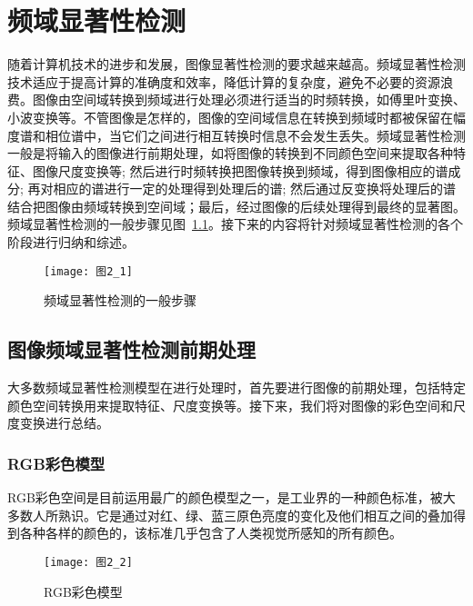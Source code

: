 

\chapter{频域显著性检测}
\label{cha2}

随着计算机技术的进步和发展，图像显著性检测的要求越来越高。频域显著性检测技术适应于提高计算的准确度和效率，降低计算的复杂度，避免不必要的资源浪费。图像由空间域转换到频域进行处理必须进行适当的时频转换，如傅里叶变换、小波变换等。不管图像是怎样的，图像的空间域信息在转换到频域时都被保留在幅度谱和相位谱中，当它们之间进行相互转换时信息不会发生丢失。频域显著性检测一般是将输入的图像进行前期处理，如将图像的转换到不同颜色空间来提取各种特征、图像尺度变换等; 然后进行时频转换把图像转换到频域，得到图像相应的谱成分; 再对相应的谱进行一定的处理得到处理后的谱; 然后通过反变换将处理后的谱结合把图像由频域转换到空间域；最后，经过图像的后续处理得到最终的显著图。频域显著性检测的一般步骤见图~\ref{图2_1}。接下来的内容将针对频域显著性检测的各个阶段进行归纳和综述。

\begin{figure}[h]
  \centering
  \texttt{[image: 图2\_1]}
  \caption{频域显著性检测的一般步骤}
  \label{图2_1}    
\end{figure}

\section{图像频域显著性检测前期处理}
\label{2_1}

大多数频域显著性检测模型在进行处理时，首先要进行图像的前期处理，包括特定颜色空间转换用来提取特征、尺度变换等。接下来，我们将对图像的彩色空间和尺度变换进行总结。

\subsection{RGB彩色模型}
\label{2_1_1}

RGB彩色空间是目前运用最广的颜色模型之一，是工业界的一种颜色标准，被大多数人所熟识。它是通过对红、绿、蓝三原色亮度的变化及他们相互之间的叠加得到各种各样的颜色的，该标准几乎包含了人类视觉所感知的所有颜色。

\begin{figure}[t]
  \centering
  \texttt{[image: 图2\_2]}
  \caption{RGB彩色模型}
  \label{图2_2}    
\end{figure}

